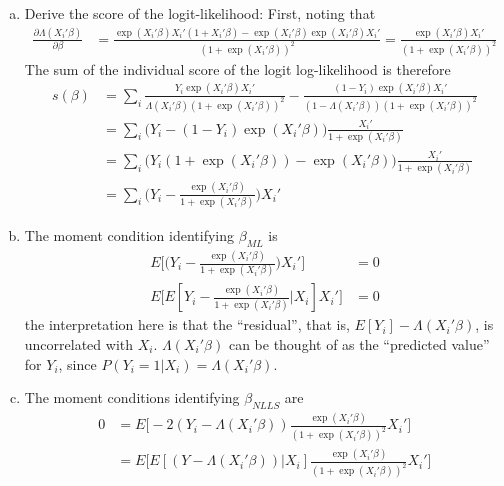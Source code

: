 \documentclass[11pt]{article}
\begin{document}
\begin{enumerate}[a)]

	\item Derive the score of the logit-likelihood:
	First, noting that
	\begin{align*}
		\frac{\partial \Lambda(X_i'\beta)}{\partial \beta} &= \frac{\exp(X_i' \beta)X_i'(1 + X_i'\beta) - \exp(X_i'\beta) \exp(X_i'\beta) X_i'}{(1+\exp(X_i'\beta))^2} = \frac{\exp(X_i'\beta)X_i'}{(1 + \exp(X_i'\beta))^2}
	\end{align*}
	The sum of the individual score of the logit log-likelihood is therefore
	\begin{align*}
		s(\beta) &= \sum_i \frac{Y_i \exp(X_i'\beta)X_i' }{\Lambda(X_i'\beta)(1 + \exp(X_i'\beta))^2} -
			\frac{(1 - Y_i)\exp(X_i'\beta)X_i'}{(1 - \Lambda(X_i'\beta))(1 + \exp(X_i'\beta))^2} \\
		&= \sum_i \Big( Y_i - (1 - Y_i)\exp(X_i'\beta) \Big) \frac{X_i'}{1 + \exp(X_i'\beta)}\\
		&= \sum_i \Big( Y_i(1 + \exp(X_i'\beta)) - \exp(X_i'\beta) \Big) \frac{X_i'}{1 + \exp(X_i'\beta)} \\
		&= \sum_i \Big( Y_i - \frac{\exp(X_i'\beta)}{1 + \exp(X_i'\beta)} \Big) X_i'
	\end{align*}
	
	\item The moment condition identifying $\beta_{ML}$ is
	\begin{align*}
		E \bigg[ \Big( Y_i - \frac{\exp(X_i'\beta)}{1 + \exp(X_i'\beta)}\Big) X_i' \bigg] &= 0 \\
		E \bigg[ E[Y_i - \frac{\exp(X_i'\beta)}{1 + \exp(X_i'\beta)}| X_i] X_i' \bigg] &= 0
	\end{align*}
	the interpretation here is that the ``residual'', that is, $E[Y_i] - \Lambda(X_i'\beta)$, is uncorrelated with $X_i$. $\Lambda(X_i'\beta)$ can be thought of as the ``predicted value'' for $Y_i$, since $P(Y_i = 1 | X_i) = \Lambda(X_i'\beta)$.
	
	\item The moment conditions identifying $\beta_{NLLS}$ are
	\begin{align*}
		0 &= E \bigg[ -2 (Y_i - \Lambda(X_i'\beta)) \frac{\exp(X_i'\beta)}{(1 + \exp(X_i'\beta))^2} X_i' \bigg] \\
		&= E \bigg[ E[(Y - \Lambda(X_i'\beta)) | X_i] \frac{\exp(X_i'\beta)}{(1 + \exp(X_i'\beta))^2} X_i' \bigg] \\
	\end{align*}


\end{enumerate}
\end{document}
